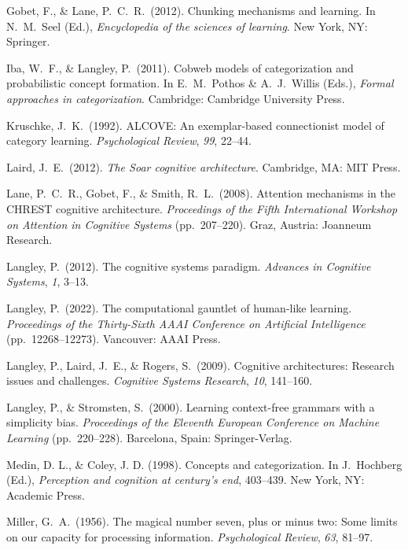 \documentclass[11pt,letterpaper]{article}
\begin{document}
{Gobet, F., \& Lane, P.\ C.\ R.\ (2012). Chunking mechanisms and 
learning. In N.\ M.\ Seel (Ed.), {\it Encyclopedia of the sciences 
of learning\/}. New York, NY: Springer. 

Iba, W.\ F., \& Langley, P.\ (2011). Cobweb models of categorization 
and probabilistic concept formation. In E.\ M.\ Pothos \& A.\ J.\ 
Willis (Eds.), {\it Formal approaches in categorization\/}. Cambridge:
Cambridge University Press.

Kruschke, J.\ K.\ (1992). ALCOVE: An exemplar-based connectionist
model of category learning. {\it Psychological Review\/}, {\it 99\/},
22--44.

Laird, J.\ E.\ (2012). {\it The Soar cognitive architecture\/}. 
Cambridge, MA: MIT Press.

Lane, P.\ C.\ R., Gobet, F., \& Smith, R.\ L.\ (2008). Attention 
mechanisms in the CHREST cognitive architecture. {\it Proceedings 
of the Fifth International Workshop on Attention in Cognitive
Systems\/} (pp.\ 207--220). Graz, Austria: Joanneum Research.

Langley, P.\ (2012). The cognitive systems paradigm. {\it Advances in
Cognitive Systems\/}, {\it 1\/}, 3--13.

Langley, P.\ (2022). The computational gauntlet of human-like learning.
{\it Proceedings of the Thirty-Sixth AAAI Conference on Artificial 
Intelligence\/} (pp.\ 12268--12273). Vancouver: AAAI Press.


Langley, P., Laird, J.\ E., \& Rogers, S.\ (2009). Cognitive
architectures: Research issues and challenges. {\it Cognitive 
Systems Research\/}, {\it 10\/}, 141--160.

Langley, P., \& Stromsten, S.\ (2000). Learning context-free grammars 
with a simplicity bias. {\it Proceedings of the Eleventh European 
Conference on Machine Learning\/} (pp.\ 220--228). Barcelona, Spain: 
Springer-Verlag.


Medin, D. L., \& Coley, J. D. (1998). Concepts and categorization.
In J.\ Hochberg (Ed.), {\it Perception and cognition at century's
end\/}, 403--439. New York, NY: Academic Press.

Miller, G.\ A.\ (1956). The magical number seven, plus or minus
two: Some limits on our capacity for processing information.
{\it Psychological Review\/}, {\it 63\/}, 81--97.

}
\end{document}
